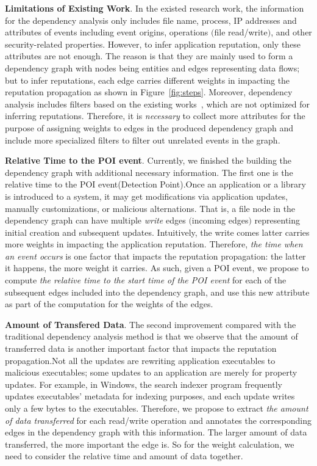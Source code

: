 \textbf{Limitations of Existing Work}.
In the existed research work, the information for the dependency analysis only includes file name, process, IP addresses and attributes of events including event origins, operations $($file read/write$)$, and other security-related properties. However, to infer application reputation, only these attributes are not enough.
The reason is that they are mainly used to form a dependency graph with nodes being entities and edges representing data flows;
but to infer reputations, each edge carries different weights in impacting the reputation propagation as shown in Figure~\ref{fig:steps}.
Moreover, dependency analysis includes filters based on the existing works~\cite{backtracking,backtracking2}, which are not optimized for inferring reputations.
Therefore, it is \emph{necessary} to collect more attributes for the purpose of assigning weights to edges in the produced dependency graph and include more specialized filters to filter out unrelated events in the graph. 

\textbf{Relative Time to the POI event}.
Currently, we finished the building the dependency graph with additional necessary information. The first one is the relative time to the POI event(Detection Point).Once an application or a library is introduced to a system, it may get modifications via application updates, manually customizations, or malicious alternations. 
That is, a file node in the dependency graph can have multiple \emph{write} edges $($incoming edges$)$ representing initial creation and subsequent updates.
Intuitively, the write comes latter carries more weights in impacting the application reputation.
Therefore, \emph{the time when an event occurs} is one factor that impacts the reputation propagation: the latter it happens, the more weight it carries.
As such, given a POI event, we propose to compute \emph{the relative time to the start time of the POI event} for each of the subsequent edges included into the dependency graph,
and use this new attribute as part of the computation for the weights of the edges. 

\textbf{Amount of Transfered Data}.
The second  improvement compared with the traditional dependency analysis method is that we observe that the amount of transferred data is another important factor that impacts the reputation propagation.Not all the updates are rewriting application executables to malicious executables; some updates to an application are merely for property updates.
For example, in Windows, the search indexer program frequently updates executables' metadata for indexing purposes, and each update writes only a few bytes to the executables.
Therefore, we propose to extract \emph{the amount of data transferred} for each read/write operation and annotates the corresponding edges in the dependency graph with this information.
The larger amount of data transferred, the more important the edge is. So for the weight calculation, we need to consider the relative time and amount of data together. 

